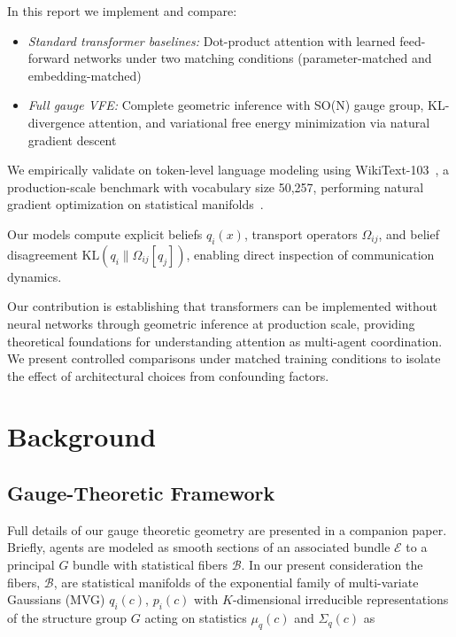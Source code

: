 \documentclass[twoside,11pt]{article}
\begin{document}
In this report we implement and compare:
    \begin{itemize}
        \item[(i)] \emph{Standard transformer baselines:} Dot-product attention with learned feed-forward networks under two matching conditions (parameter-matched and embedding-matched)
        \item[(ii)] \emph{Full gauge VFE:} Complete geometric inference with SO(N) gauge group, KL-divergence attention, and variational free energy minimization via natural gradient descent
    \end{itemize}

We empirically validate on token-level language modeling using WikiText-103~\citep{merity2016pointer}, a production-scale benchmark with vocabulary size 50,257, performing natural gradient optimization on statistical manifolds~\citep{amari1998natural,martens2015optimizing}.

Our models compute explicit beliefs $q_i(x)$, transport operators $\Omega_{ij}$, and belief disagreement $\mathrm{KL}(q_i \| \Omega_{ij}[q_j])$, enabling direct inspection of communication dynamics.

Our contribution is establishing that transformers can be implemented without neural networks through geometric inference at production scale, providing theoretical foundations for understanding attention as multi-agent coordination. We present controlled comparisons under matched training conditions to isolate the effect of architectural choices from confounding factors.


\section{Background}
\label{sec:background}

\subsection{Gauge-Theoretic Framework}

Full details of our gauge theoretic geometry are presented in a companion paper. Briefly, agents are modeled as smooth sections of an associated bundle $\mathcal{E}$ to a principal $G$ bundle with statistical fibers $\mathcal{B}$. In our present consideration the fibers,  $\mathcal{B}$, are statistical manifolds of the exponential family of multi-variate Gaussians (MVG) $q_i(c)$, $p_i(c)$ with $K$-dimensional irreducible representations of the structure group $G$ acting on statistics $\mu_q(c)$ and $\Sigma_q(c)$ as
\end{document}
